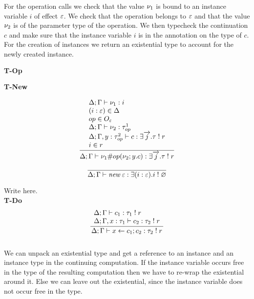 For the operation calls we check that the value $\nu_1$ is bound to an instance variable $i$ of effect $\varepsilon$.
We check that the operation belongs to $\varepsilon$ and that the value $\nu_2$ is of the parameter type of the operation.
We then typecheck the continuation $c$ and make sure that the instance variable $i$ is in the annotation on the type of $c$. \\
For the creation of instances we return an existential type to account for the newly created instance. \\
\begin{minipage}{0.5\textwidth}
\textbf{T-Op}
\end{minipage}
\begin{minipage}{0.5\textwidth}
\textbf{T-New}
\end{minipage}
\begin{minipage}{0.5\textwidth}
\[\frac{
	\begin{array}{l}
	\Delta;\Gamma \vdash \nu_1 : i \\
	(i:\varepsilon)\in\Delta \\
	op \in O_\varepsilon\\
	\Delta;\Gamma \vdash \nu_2 : \tau^1_{op} \\
	\Delta;\Gamma , y : \tau^2_{op} \vdash c : \exists \overrightarrow{j} . \tau \; ! \; r \\
	i \in r
	\end{array}
}{
	\Delta;\Gamma \vdash \nu_1 \# op(\nu_2 ; y . c) : \exists \overrightarrow{j} . \tau \; ! \; r
}\]
\vspace{10pt}
\end{minipage}
\begin{minipage}{0.5\textwidth}
\[\frac{
}{
	\Delta;\Gamma \vdash \textit{new} \; \varepsilon : \exists(i:\varepsilon) . i \; ! \; \varnothing
}\]
\vspace{10pt}
\end{minipage}
\newpage
Write here. \\
\textbf{T-Do}
\[\frac{
	\begin{array}{l}
	\Delta;\Gamma \vdash c_1 : \tau_1 \; ! \; r \\
	\Delta; \Gamma, x : \tau_1 \vdash c_2 : \tau_2 \; ! \; r
	\end{array}
}{
	\Delta;\Gamma \vdash x \leftarrow c_1 ; c_2 : \tau_2 \; ! \; r
}\]
\\
We can unpack an existential type and get a reference to an instance and an instance type in the continuing computation.
If the instance variable occurs free in the type of the resulting computation then we have to re-wrap the existential around it.
Else we can leave out the existential, since the instance variable does not occur free in the type.\\
